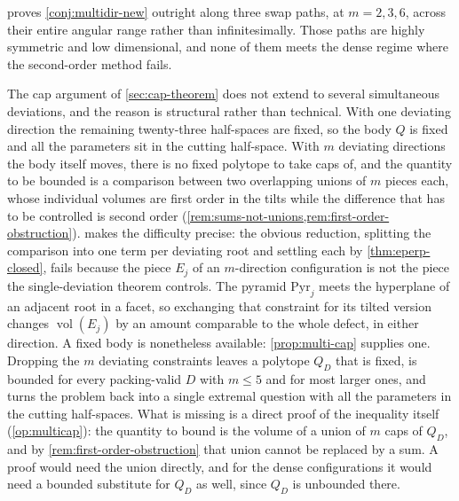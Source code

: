 \documentclass[11pt,reqno]{amsart}
\renewcommand{\_}{\origunderscore\allowbreak}
\numberwithin{equation}{section}
\theoremstyle{plain}
\theoremstyle{definition}
\theoremstyle{remark}
\DeclareMathOperator{\vol}{vol}
\begin{document}
 proves \cref{conj:multidir-new} outright along
three swap paths, at $m=2,3,6$, across their entire angular range rather
than infinitesimally. Those paths are highly symmetric and low
dimensional, and none of them meets the dense regime where the
second-order method fails.

The cap argument of \cref{sec:cap-theorem} does not extend to several
simultaneous deviations, and the reason is structural rather than
technical. With one deviating direction the remaining twenty-three
half-spaces are fixed, so the body $Q$ is fixed and all the parameters
sit in the cutting half-space. With $m$ deviating directions the body
itself moves, there is no fixed polytope to take caps of, and the
quantity to be bounded is a comparison between two overlapping unions
of $m$ pieces each, whose individual volumes are first order in the
tilts while the difference that has to be controlled is second order
(\cref{rem:sums-not-unions,rem:first-order-obstruction}).  makes the difficulty precise: the
obvious reduction, splitting the comparison into one term per deviating
root and settling each by \cref{thm:eperp-closed}, fails because the
piece $E_j$ of an $m$-direction configuration is not the piece the
single-deviation theorem controls. The pyramid $\mathrm{Pyr}_j$ meets
the hyperplane of an adjacent root in a facet, so exchanging that
constraint for its tilted version changes $\vol(E_j)$ by an amount
comparable to the whole defect, in either direction. A fixed body is
nonetheless available: \cref{prop:multi-cap} supplies one. Dropping the
$m$ deviating constraints leaves a polytope $Q_D$ that is fixed, is
bounded for every packing-valid $D$ with $m\le5$ and for most larger
ones, and turns the problem back into a single extremal question with
all the parameters in the cutting half-spaces. What is missing is a direct proof of the
inequality itself (\cref{op:multicap}): the quantity to bound is the
volume of a union of $m$ caps of $Q_D$, and by
\cref{rem:first-order-obstruction} that union cannot be replaced by a
sum. A proof would need the union directly, and for the dense
configurations it would need a bounded substitute for $Q_D$ as well,
since $Q_D$ is unbounded there.
\end{document}
